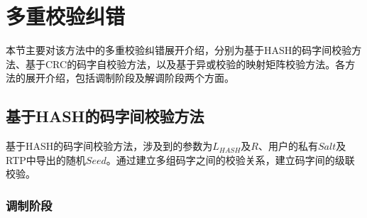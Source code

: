 \section{多重校验纠错}
\label{chap:hash:robustness}

本节主要对该方法中的多重校验纠错展开介绍，分别为基于HASH的码字间校验方法、基于CRC的码字自校验方法，以及基于异或校验的映射矩阵校验方法。各方法的展开介绍，包括调制阶段及解调阶段两个方面。

\subsection{基于HASH的码字间校验方法}
\label{chap:hash:robustness:hash}

基于HASH的码字间校验方法，涉及到的参数为$L_{HASH}$及$R$、用户的私有$Salt$及RTP中导出的随机$Seed$。通过建立多组码字之间的校验关系，建立码字间的级联校验。

\subsubsection{调制阶段}
\label{chap:hash:robustness:hash:modulation}

